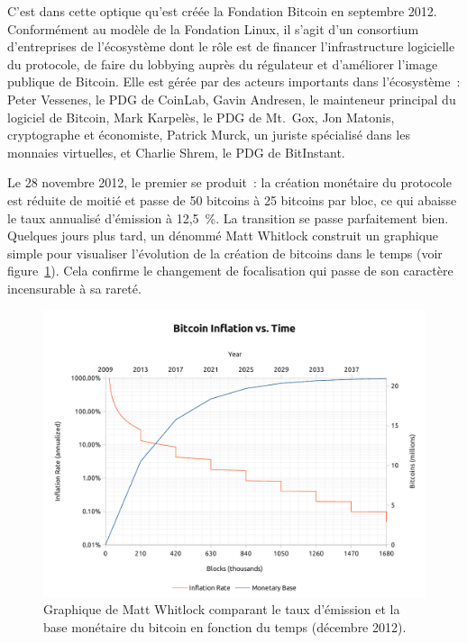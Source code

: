 C'est dans cette optique qu'est créée la Fondation Bitcoin en septembre 2012. Conformément au modèle de la Fondation Linux, il s'agit d'un consortium d'entreprises de l'écosystème dont le rôle est de financer l'infrastructure logicielle du protocole, de faire du lobbying auprès du régulateur et d'améliorer l'image publique de Bitcoin. Elle est gérée par des acteurs importants dans l'écosystème~: Peter Vessenes, le PDG de CoinLab, Gavin Andresen, le mainteneur principal du logiciel de Bitcoin, Mark Karpelès, le PDG de Mt.~Gox, Jon Matonis, cryptographe et économiste, Patrick Murck, un juriste spécialisé dans les monnaies virtuelles, et Charlie Shrem, le PDG de BitInstant.

Le 28 novembre 2012, le premier  se produit~: la création monétaire du protocole est réduite de moitié et passe de 50 bitcoins à 25 bitcoins par bloc, ce qui abaisse le taux annualisé d'émission à 12,5~\%. La transition se passe parfaitement bien. Quelques jours plus tard, un dénommé Matt Whitlock construit un graphique simple pour visualiser l'évolution de la création de bitcoins dans le temps (voir figure~\ref{fig:bitcoin-inflation}). Cela confirme le changement de focalisation qui passe de son caractère incensurable à sa rareté.

\begin{figure}[h]
  \centering
  \includegraphics[scale=0.5]{img/matt-whitlock-bitcoin-inflation-log.pdf}
  \caption{Graphique de Matt Whitlock comparant le taux d'émission et la base monétaire du bitcoin en fonction du temps (décembre 2012).}
  \label{fig:bitcoin-inflation}
\end{figure}

